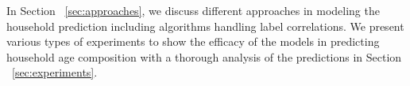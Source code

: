 In Section ~\ref{sec:approaches}, we discuss different approaches in modeling the household prediction including algorithms handling label correlations. We present various types of experiments to show the efficacy of the models in predicting household age composition with a thorough analysis of the predictions in Section ~\ref{sec:experiments}. 






